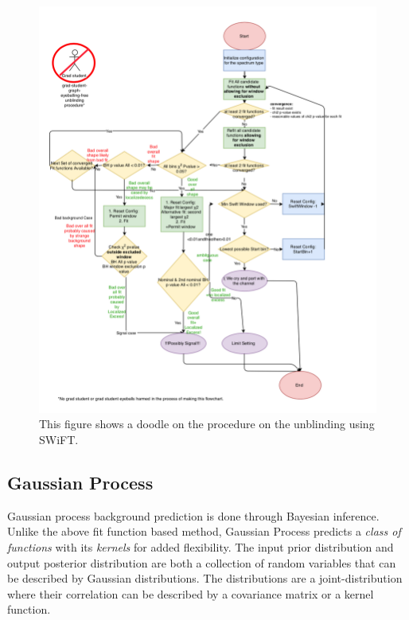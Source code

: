 \begin{figure}[!htb] \begin{center}
        \includegraphics[width=1.05\textwidth]{figures/chapter_analysismethod/swift_unblindingflowchart}
        \caption{
            This figure shows a doodle on the procedure on the unblinding using SWiFT.
        }
        \label{fig:unblinding}
    \end{center}
\end{figure}
\FloatBarrier
    
    \subsection{Gaussian Process} 
    \label{sec:GP}

    Gaussian process background prediction is done through Bayesian inference. Unlike the above fit function based method, Gaussian Process predicts a \textit{class of functions} with its \textit{kernels} for added flexibility. The input prior distribution and output posterior distribution are both a collection of random variables that can be described by Gaussian distributions. The distributions are a joint-distribution where their correlation can be described by a covariance matrix or a kernel function. 

